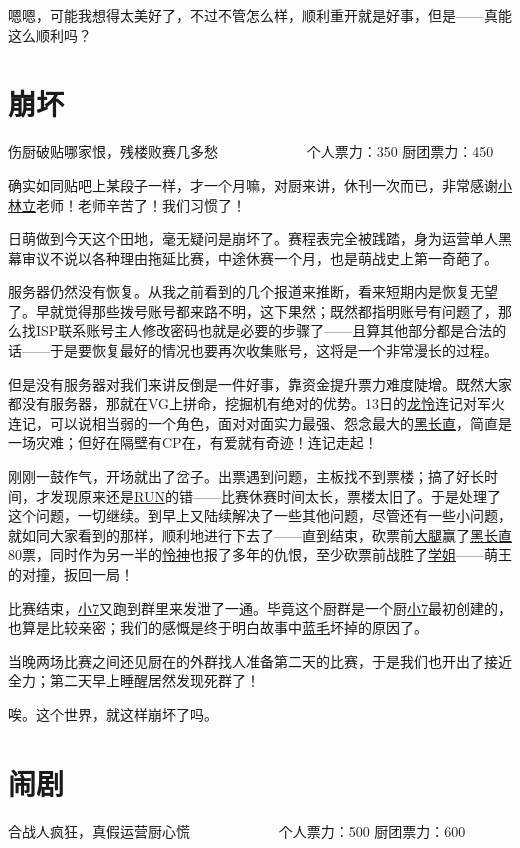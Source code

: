嗯嗯，可能我想得太美好了，不过不管怎么样，顺利重开就是好事，但是——真能这么顺利吗？

\chapter{崩坏}
\begin{center}
{\subTitle 伤厨破贴哪家恨，残楼败赛几多愁}
\subMemo
　　　　　　个人票力：350 厨团票力：450
\end{center}

确实如同贴吧上某段子一样，才一个月嘛，对厨来讲，休刊一次而已，非常感谢\uline{小林立}老师！老师辛苦了！我们习惯了！

日萌做到今天这个田地，毫无疑问是崩坏了。赛程表完全被践踏，身为运营单人黑幕审议不说以各种理由拖延比赛，中途休赛一个月，也是萌战史上第一奇葩了。

服务器仍然没有恢复。从我之前看到的几个报道来推断，看来短期内是恢复无望了。早就觉得那些拨号账号都来路不明，这下果然；既然都指明账号有问题了，那么找ISP联系账号主人修改密码也就是必要的步骤了——且算其他部分都是合法的话——于是要恢复最好的情况也要再次收集账号，这将是一个非常漫长的过程。

但是没有服务器对我们来讲反倒是一件好事，靠资金提升票力难度陡增。既然大家都没有服务器，那就在VG上拼命，挖掘机有绝对的优势。13日的\uline{龙}\uline{怜}连记对军火连记，可以说相当弱的一个角色，面对对面实力最强、怨念最大的\uline{黑长直}，简直是一场灾难；但好在隔壁有CP在，有爱就有奇迹！连记走起！

刚刚一鼓作气，开场就出了岔子。出票遇到问题，主板找不到票楼；搞了好长时间，才发现原来还是\uline{RUN}的错——比赛休赛时间太长，票楼太旧了。于是处理了这个问题，一切继续。到早上又陆续解决了一些其他问题，尽管还有一些小问题，就如同大家看到的那样，顺利地进行下去了——直到结束，砍票前\uline{大腿}赢了\uline{黑长直}80票，同时作为另一半的\uline{怜神}也报了多年的仇恨，至少砍票前战胜了\uline{学姐}——萌王的对撞，扳回一局！

比赛结束，\uline{小7}又跑到群里来发泄了一通。毕竟这个厨群是一个厨\uline{小7}最初创建的，也算是比较亲密；我们的感慨是终于明白故事中\uline{蓝毛}坏掉的原因了。

当晚两场比赛之间还见厨在的外群找人准备第二天的比赛，于是我们也开出了接近全力；第二天早上睡醒居然发现死群了！

唉。这个世界，就这样崩坏了吗。

\chapter{闹剧}
\begin{center}
{\subTitle {}合战人疯狂，真假运营厨心慌}
\subMemo
　　　　　　个人票力：500 厨团票力：600
\end{center}

